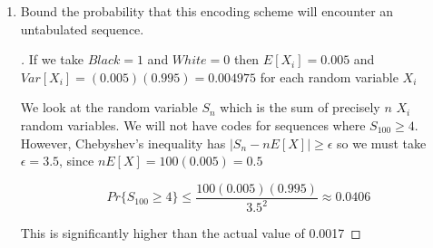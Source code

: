 \documentclass[]{book}
\theoremstyle{definition}
\begin{document}
\begin{enumerate}
\begin{proof}[\unskip\nopunct]










\end{proof}

\item	Bound the probability that this encoding scheme will encounter an untabulated sequence.

\begin{proof}[\unskip\nopunct]
		
If we take $Black = 1$ and $White = 0$ then $E[X_{i}] = 0.005$ and $Var[X_{i}] = (0.005)(0.995) = 0.004975$ for each random variable $X_{i}$

We look at the random variable $S_{n}$ which is the sum of precisely $n$  $X_{i}$ random variables. We will not have codes for sequences where $S_{100} \geq 4$. However, Chebyshev's inequality has $|S_{n} - nE[X]| \geq \epsilon$ so we must take $\epsilon = 3.5$, since $nE[X] = 100(0.005) = 0.5$

$$Pr\{S_{100} \geq 4\} \leq \dfrac{100(0.005)(0.995)}{3.5^{2}} \approx 0.0406$$

This is significantly higher than the actual value of 0.0017

\end{proof}

\end{enumerate}
\end{document}
